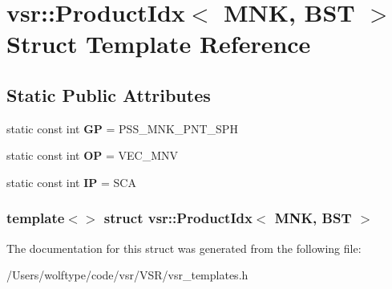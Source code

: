 \hypertarget{structvsr_1_1_product_idx_3_01_m_n_k_00_01_b_s_t_01_4}{\section{vsr\-:\-:Product\-Idx$<$ M\-N\-K, B\-S\-T $>$ Struct Template Reference}
\label{structvsr_1_1_product_idx_3_01_m_n_k_00_01_b_s_t_01_4}
}
\subsection*{Static Public Attributes}
\begin{DoxyCompactItemize}
\item 
\hypertarget{structvsr_1_1_product_idx_3_01_m_n_k_00_01_b_s_t_01_4_a4a68024c0e33b2fca744e2c5458bd8df}{static const int {\bfseries G\-P} = P\-S\-S\-\_\-\-M\-N\-K\-\_\-\-P\-N\-T\-\_\-\-S\-P\-H}\label{structvsr_1_1_product_idx_3_01_m_n_k_00_01_b_s_t_01_4_a4a68024c0e33b2fca744e2c5458bd8df}

\item 
\hypertarget{structvsr_1_1_product_idx_3_01_m_n_k_00_01_b_s_t_01_4_a14ad8b0ce0a3b256b02d2044423407df}{static const int {\bfseries O\-P} = V\-E\-C\-\_\-\-M\-N\-V}\label{structvsr_1_1_product_idx_3_01_m_n_k_00_01_b_s_t_01_4_a14ad8b0ce0a3b256b02d2044423407df}

\item 
\hypertarget{structvsr_1_1_product_idx_3_01_m_n_k_00_01_b_s_t_01_4_adce89bc73c73d997668fd940907248ac}{static const int {\bfseries I\-P} = S\-C\-A}\label{structvsr_1_1_product_idx_3_01_m_n_k_00_01_b_s_t_01_4_adce89bc73c73d997668fd940907248ac}

\end{DoxyCompactItemize}
\subsubsection*{template$<$$>$ struct vsr\-::\-Product\-Idx$<$ M\-N\-K, B\-S\-T $>$}



The documentation for this struct was generated from the following file\-:\begin{DoxyCompactItemize}
\item 
/\-Users/wolftype/code/vsr/\-V\-S\-R/vsr\-\_\-templates.\-h\end{DoxyCompactItemize}
